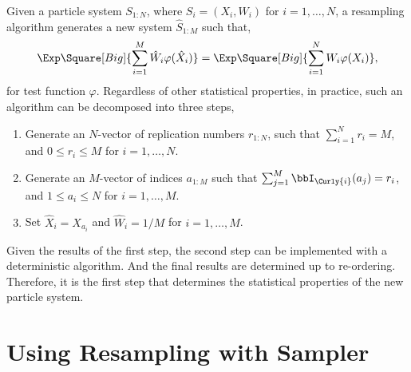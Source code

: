 Given a particle system $S_{1:N}$, where $S_i = (X_i,W_i)$ for $i = 1,\dots,N$,
a resampling algorithm generates a new system $\hat{S}_{1:M}$ such that,
\begin{equation*}
  \Exp\Square[Big]{\sum_{i=1}^M{\hat{W}_i\varphi(\hat{X}_i)}} =
  \Exp\Square[Big]{\sum_{i=1}^N{W_i\varphi(X_i)}},
\end{equation*}
for test function $\varphi$. Regardless of other statistical properties, in
practice, such an algorithm can be decomposed into three steps,
\begin{enumerate}
  \item Generate an $N$-vector of replication numbers $r_{1:N}$, such that
    $\sum_{i=1}^N r_i = M$, and $0 \le r_i \le M$ for $i=1,\dots,N$.
  \item Generate an $M$-vector of indices $a_{1:M}$ such that $\sum_{j=1}^M
    \bbI_{\Curly{i}}(a_j) = r_i$, and $1 \le a_i \le N$ for $i = 1,\dots,M$.
  \item Set $\hat{X}_i = X_{a_i}$ and $\hat{W}_i = 1 / M$ for $i = 1,\dots,M$.
\end{enumerate}
Given the results of the first step, the second step can be implemented with a
deterministic algorithm. And the final results are determined up to
re-ordering. Therefore, it is the first step that determines the statistical
properties of the new particle system.

\section{Using Resampling with Sampler}
\label{sec:Using Resampling with Sampler}

